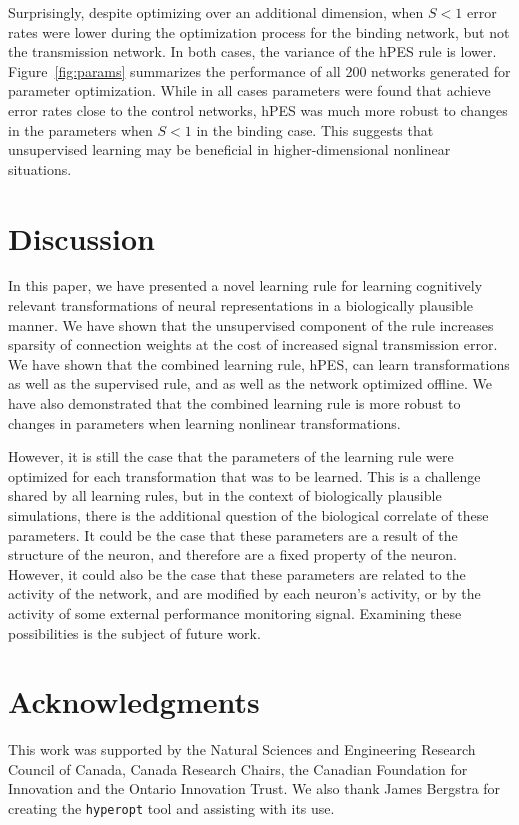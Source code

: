 \documentclass[10pt,letterpaper]{article}
\begin{document}
Surprisingly, despite optimizing over an additional dimension,
when $S < 1$ error rates were
lower during the optimization process
for the binding network, but not the transmission network.
In both cases, the variance of the hPES rule is lower.
Figure~\ref{fig:params} summarizes the performance of
all 200 networks generated for parameter optimization.
While in all cases parameters were found that achieve
error rates close to the control networks,
hPES was much more robust to changes
in the parameters when $S < 1$ in the binding case.
This suggests that unsupervised learning
may be beneficial in higher-dimensional nonlinear situations.

\section{Discussion}

In this paper, we have presented a novel learning rule
for learning cognitively relevant transformations
of neural representations
in a biologically plausible manner.
We have shown that the unsupervised component of the rule
increases sparsity of connection weights
at the cost of increased signal transmission error.
We have shown that the combined learning rule, hPES,
can learn transformations as well as the supervised rule,
and as well as the network optimized offline.
We have also demonstrated that the combined learning rule
is more robust to changes in parameters
when learning nonlinear transformations.

However, it is still the case that
the parameters of the learning rule
were optimized for each transformation
that was to be learned.
This is a challenge shared by all learning rules,
but in the context of biologically plausible simulations,
there is the additional question of
the biological correlate of these parameters.
It could be the case that these parameters
are a result of the structure of the neuron,
and therefore are a fixed property of the neuron.
However, it could also be the case that
these parameters are related to the activity of the network,
and are modified by each neuron's activity,
or by the activity of some external
performance monitoring signal.
Examining these possibilities is the subject
of future work.

\section{Acknowledgments}

This work was supported by the Natural Sciences
and Engineering Research Council of Canada,
Canada Research Chairs,
the Canadian Foundation for Innovation
and the Ontario Innovation Trust.
We also thank James Bergstra for creating
the \texttt{hyperopt} tool and assisting
with its use.



\setlength{\bibleftmargin}{.125in}
\setlength{\bibindent}{-\bibleftmargin}


\end{document}
